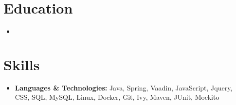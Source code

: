 \documentclass[11pt,a4paper,sans]{moderncv}        %
\begin{document}
\section{Education}

\vspace{5pt}

\begin{itemize}

\item{}

\end{itemize}

\vspace{2pt}

\section{ Skills}

\vspace{6pt}

\begin{itemize}

\item \textbf{Languages \& Technologies:} Java, Spring, Vaadin, JavaScript, Jquery, CSS, SQL, MySQL, Linux, Docker, Git, Ivy, Maven, JUnit, Mockito






\end{itemize}



 
\end{document}
